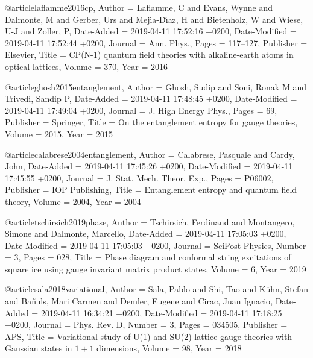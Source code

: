 \documentclass[epj,final]{svjour}
\begin{document}
@article{laflamme2016cp,
	Author = {Laflamme, C and Evans, Wynne and Dalmonte, M and Gerber, Urs and Mej{\'\i}a-D{\'\i}az, H and Bietenholz, W and Wiese, U-J and Zoller, P},
	Date-Added = {2019-04-11 17:52:16 +0200},
	Date-Modified = {2019-04-11 17:52:44 +0200},
	Journal = {Ann. Phys.},
	Pages = {117--127},
	Publisher = {Elsevier},
	Title = {{CP(N-1)} quantum field theories with alkaline-earth atoms in optical lattices},
	Volume = {370},
	Year = {2016}}

@article{ghosh2015entanglement,
	Author = {Ghosh, Sudip and Soni, Ronak M and Trivedi, Sandip P},
	Date-Added = {2019-04-11 17:48:45 +0200},
	Date-Modified = {2019-04-11 17:49:04 +0200},
	Journal = {J. High Energy Phys.},
	Pages = {69},
	Publisher = {Springer},
	Title = {On the entanglement entropy for gauge theories},
	Volume = {2015},
	Year = {2015}}

@article{calabrese2004entanglement,
	Author = {Calabrese, Pasquale and Cardy, John},
	Date-Added = {2019-04-11 17:45:26 +0200},
	Date-Modified = {2019-04-11 17:45:55 +0200},
	Journal = {J. Stat. Mech. Theor. Exp.},
	Pages = {P06002},
	Publisher = {IOP Publishing},
	Title = {Entanglement entropy and quantum field theory},
	Volume = {2004},
	Year = {2004}}

@article{tschirsich2019phase,
	Author = {Tschirsich, Ferdinand and Montangero, Simone and Dalmonte, Marcello},
	Date-Added = {2019-04-11 17:05:03 +0200},
	Date-Modified = {2019-04-11 17:05:03 +0200},
	Journal = {SciPost Physics},
	Number = {3},
	Pages = {028},
	Title = {Phase diagram and conformal string excitations of square ice using gauge invariant matrix product states},
	Volume = {6},
	Year = {2019}}

@article{sala2018variational,
	Author = {Sala, Pablo and Shi, Tao and K{\"u}hn, Stefan and Ba{\~n}uls, Mari Carmen and Demler, Eugene and Cirac, Juan Ignacio},
	Date-Added = {2019-04-11 16:34:21 +0200},
	Date-Modified = {2019-04-11 17:18:25 +0200},
	Journal = {Phys. Rev. D},
	Number = {3},
	Pages = {034505},
	Publisher = {APS},
	Title = {Variational study of {U(1)} and {SU(2)} lattice gauge theories with Gaussian states in $1+1$ dimensions},
	Volume = {98},
	Year = {2018}}
\end{document}
